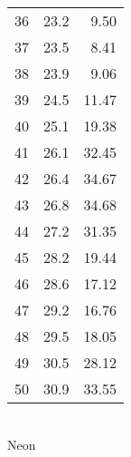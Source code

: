 \documentclass[a4paper,10pt]{article}
\begin{document}
\begin{tabular}{lrr}
36 &  23.2 &   9.50 \\
37 &  23.5 &   8.41 \\
38 &  23.9 &   9.06 \\
39 &  24.5 &  11.47 \\
40 &  25.1 &  19.38 \\
41 &  26.1 &  32.45 \\
42 &  26.4 &  34.67 \\
43 &  26.8 &  34.68 \\
44 &  27.2 &  31.35 \\
45 &  28.2 &  19.44 \\
46 &  28.6 &  17.12 \\
47 &  29.2 &  16.76 \\
48 &  29.5 &  18.05 \\
49 &  30.5 &  28.12 \\
50 &  30.9 &  33.55 \\
\bottomrule
\end{tabular}
\\Neon
\end{document}
